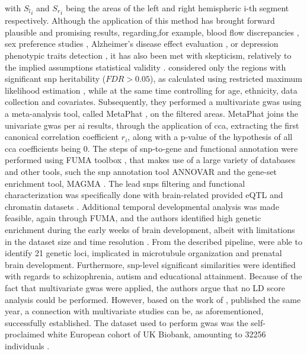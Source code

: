 with ${S_l}_i$ and ${S_r}_i$ being the areas of the left and right hemispheric i-th segment respectively. Although the application of this method has brought forward plausible and promising results, regarding,for example, blood flow discrepancies \cite{Graham2022}, sex preference studies \cite{Savic2008}, Alzheimer's disease effect evaluation \cite{Sarica2018},  or depression phenotypic traits detection \cite{Zuo2019}, it has also been met with skepticism, relatively to the implied assumptions statistical validity \cite{Coles2008}. \citet{Sha2021} considered only the regions with significant \ac{snp} heritability ($FDR>0.05$), as calculated using restricted maximum likelihood estimation \cite{Yang2010}, while at the same time controlling for age, ethnicity, data collection and covariates. Subsequently, they performed a multivariate \ac{gwas}  using a meta-analysis tool, called MetaPhat \cite{Lin2020}, on the filtered areas. MetaPhat joins the univariate \ac{gwas} per \ac{ai} results, through the application of \ac{cca}, extracting the first canonical correlation coefficient $r_i$, along with a p-value of the hypothesis of all \ac{cca} coefficients being 0. The steps of snp-to-gene and functional annotation were performed using FUMA toolbox \cite{Watanabe2017}, that makes use of a large variety of databases and other tools, such the \ac{snp} annotation tool ANNOVAR \cite{Wang2010} and  the gene-set enrichment tool, MAGMA \cite{DeLeeuw2015}. The lead \acp{snp} filtering and functional characterization was specifically done with brain-related provided eQTL and chromatin datasets \cite{Sha2021}. Additional temporal developmental analysis was made feasible, again through FUMA, and the authors identified high genetic enrichment during the early weeks of brain development, albeit with limitations in the dataset size and time resolution \cite{Kang2011}.  From the described pipeline, \citet{Sha2021} were able to identify 21 genetic loci, implicated in microtubule organization and prenatal brain development. Furthermore, \ac{snp}-level significant similarities were identified with regards to schizophrenia, autism and educational attainment\cite{Sha2021}. Because of the fact that multivariate \ac{gwas} were applied, the authors argue that no LD score analysis could be performed. However, based on the work of \citet{Naqvi2021}, published the same year, a connection with multivariate studies can be, as aforementioned, successfully established. The dataset used to perform \ac{gwas} was the self-proclaimed white European cohort of UK Biobank, amounting to 32256 individuals \cite{Littlejohns2020}.

